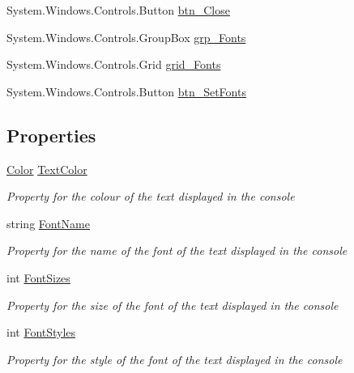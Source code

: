 \begin{DoxyCompactItemize}
System.\+Windows.\+Controls.\+Button \hyperlink{class_c_p_u___o_s___simulator_1_1_console_window_a532cd67c30fdb581d7f7cdccacb388ff}{btn\+\_\+\+Close}
\item 
System.\+Windows.\+Controls.\+Group\+Box \hyperlink{class_c_p_u___o_s___simulator_1_1_console_window_a2d8d6d1f3ee210b44e0eabd3c063438d}{grp\+\_\+\+Fonts}
\item 
System.\+Windows.\+Controls.\+Grid \hyperlink{class_c_p_u___o_s___simulator_1_1_console_window_a5dd489a5756d308a9adc8498dea24ddb}{grid\+\_\+\+Fonts}
\item 
System.\+Windows.\+Controls.\+Button \hyperlink{class_c_p_u___o_s___simulator_1_1_console_window_acc0899b3327a38a47568660cf947ee31}{btn\+\_\+\+Set\+Fonts}
\end{DoxyCompactItemize}
\subsection*{Properties}
\begin{DoxyCompactItemize}
\item 
\hyperlink{_console_window_8xaml_8cs_adf2800823d988ace598d734fdec29975}{Color} \hyperlink{class_c_p_u___o_s___simulator_1_1_console_window_a9ed1d4cf5229b50e355092d33ea0c3e6}{Text\+Color}
\begin{DoxyCompactList}\small\item\em Property for the colour of the text displayed in the console \end{DoxyCompactList}\item 
string \hyperlink{class_c_p_u___o_s___simulator_1_1_console_window_a752c6bed63b2368b26a4287a2902ef61}{Font\+Name}
\begin{DoxyCompactList}\small\item\em Property for the name of the font of the text displayed in the console \end{DoxyCompactList}\item 
int \hyperlink{class_c_p_u___o_s___simulator_1_1_console_window_a3f0174de74f8505bc6880ec7a67cd61f}{Font\+Sizes}
\begin{DoxyCompactList}\small\item\em Property for the size of the font of the text displayed in the console \end{DoxyCompactList}\item 
int \hyperlink{class_c_p_u___o_s___simulator_1_1_console_window_a1984ceb7ee007669685c8de6c4554b06}{Font\+Styles}
\begin{DoxyCompactList}\small\item\em Property for the style of the font of the text displayed in the console \end{DoxyCompactList}\end{DoxyCompactItemize}
